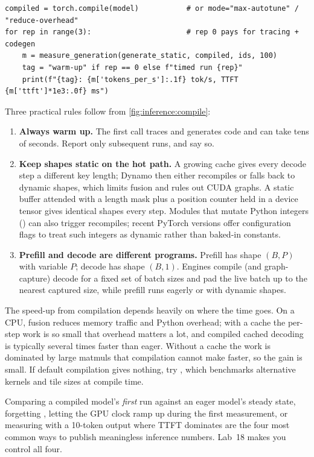 \begin{lstlisting}[caption={Compiling and benchmarking with warm-up runs.},label={lst:inference:compile}]
compiled = torch.compile(model)           # or mode="max-autotune" / "reduce-overhead"
for rep in range(3):                      # rep 0 pays for tracing + codegen
    m = measure_generation(generate_static, compiled, ids, 100)
    tag = "warm-up" if rep == 0 else f"timed run {rep}"
    print(f"{tag}: {m['tokens_per_s']:.1f} tok/s, TTFT {m['ttft']*1e3:.0f} ms")
\end{lstlisting}

Three practical rules follow from \cref{fig:inference:compile}:
\begin{enumerate}
  \item \textbf{Always warm up.} The first call traces and generates code and can take tens of
    seconds. Report only subsequent runs, and say so.
  \item \textbf{Keep shapes static on the hot path.} A growing  cache gives every
    decode step a different key length; Dynamo then either recompiles or falls back to dynamic
    shapes, which limits fusion and rules out CUDA graphs. A static buffer attended with a length
    mask plus a position counter held in a device tensor gives identical shapes every step. Modules that mutate Python integers
    () can also trigger recompiles; recent PyTorch versions offer configuration
    flags to treat such integers as dynamic rather than baked-in constants.
  \item \textbf{Prefill and decode are different programs.} Prefill has shape $(B,P)$ with variable
    $P$; decode has shape $(B,1)$. Engines compile (and graph-capture) decode for a fixed set of
    batch sizes and pad the live batch up to the nearest captured size, while prefill runs eagerly
    or with dynamic shapes.
\end{enumerate}

The speed-up from compilation depends heavily on where the time goes. On a CPU, fusion reduces
memory traffic and Python overhead; with a cache the per-step work is so small that overhead
matters a lot, and compiled cached decoding is typically several times faster than eager. Without
a cache the work is dominated by large matmuls that compilation cannot make faster, so the gain is
small. If default compilation gives nothing, try , which benchmarks
alternative kernels and tile sizes at compile time.

\begin{pitfall}
Comparing a compiled model's \emph{first} run against an eager model's steady state, forgetting
, letting the GPU clock ramp up during the first measurement, or measuring
with a 10-token output where TTFT dominates are the four most common ways to publish meaningless
inference numbers. Lab~18 makes you control all four.
\end{pitfall}


